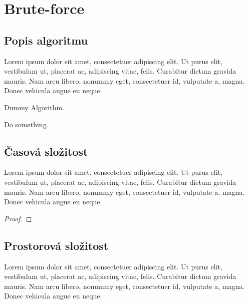 \chapter{Brute-force}
    \label{chapter:Algo1}
    \lipsum[1]

    \section{Popis algoritmu}
        Lorem ipsum dolor sit amet, consectetuer adipiscing elit. Ut purus elit, vestibulum ut, placerat ac, adipiscing vitae, felis. Curabitur dictum gravida mauris. Nam arcu libero, nonummy eget, consectetuer id, vulputate a, magna. Donec vehicula augue eu neque.

        \begin{algorithm}[h]
            \SetAlgoLined
            \caption{Dummy Algorithm.}
            Do something.\;
        \end{algorithm}

        \lipsum[1-2]

    \section{Časová složitost}
        \begin{theorem}
            Lorem ipsum dolor sit amet, consectetuer adipiscing elit. Ut purus elit, vestibulum ut, placerat ac, adipiscing vitae, felis. Curabitur dictum gravida mauris. Nam arcu libero, nonummy eget, consectetuer id, vulputate a, magna. Donec vehicula augue eu neque.
        \end{theorem}

        \begin{proof}
            \lipsum[1]
        \end{proof}

    \section{Prostorová složitost}
        \begin{theorem}
            Lorem ipsum dolor sit amet, consectetuer adipiscing elit. Ut purus elit, vestibulum ut, placerat ac, adipiscing vitae, felis. Curabitur dictum gravida mauris. Nam arcu libero, nonummy eget, consectetuer id, vulputate a, magna. Donec vehicula augue eu neque.
        \end{theorem}

